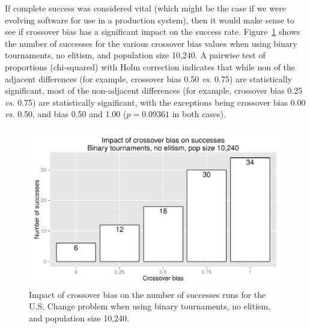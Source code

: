\documentclass{sig-alternate}
\begin{document}
%
%
%
%

If complete success was considered vital (which might be the case if we were evolving software for use in a production
system), then it would make sense to see if crossover bias has a significant impact on the success rate.
Figure~\ref{fig:USChange_Successes_strong} shows the number of successes for the various crossover bias values when
using binary tournaments, no elitism, and population size 10,240. A pairwise test of proportions (chi-squared) with
Holm correction indicates that while non of the adjacent differences (for example, crossover bias 0.50 \emph{vs.} 0.75)
are statistically significant, most of the non-adjacent differences (for example, crossover bias 0.25 \emph{vs.} 0.75)
are statistically significant, with the exceptions being crossover bias 0.00 \emph{vs.} 0.50, and bias 0.50 and 1.00
($p=0.09361$ in both cases).

\begin{figure}
\centering
\includegraphics[width=0.45 \textwidth]{Plots/US_change_successes_strong.pdf}
\caption{Impact of crossover bias on the number of successes runs for the U.S. Change problem when using binary
tournaments, no elitism, and population size 10,240.}
\label{fig:USChange_Successes_strong}
\end{figure}

%
%
%
%
\end{document}

